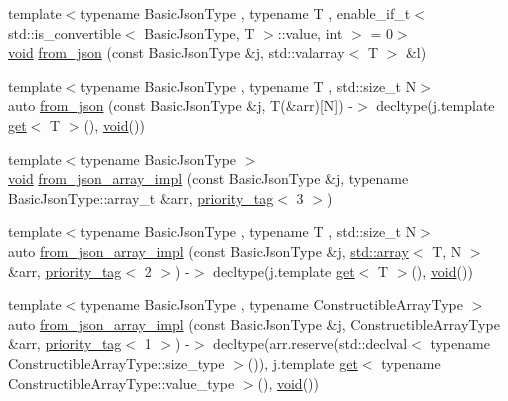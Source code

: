 \begin{DoxyCompactItemize}
\item 
{\footnotesize template$<$typename Basic\+Json\+Type , typename T , enable\+\_\+if\+\_\+t$<$ std\+::is\+\_\+convertible$<$ Basic\+Json\+Type, T $>$\+::value, int $>$  = 0$>$ }\\\mbox{\hyperlink{namespacenlohmann_1_1detail_a59fca69799f6b9e366710cb9043aa77d}{void}} \mbox{\hyperlink{namespacenlohmann_1_1detail_a3df497b1d3977f071b488ecac1401517}{from\+\_\+json}} (const Basic\+Json\+Type \&j, std\+::valarray$<$ T $>$ \&l)
\item 
{\footnotesize template$<$typename Basic\+Json\+Type , typename T , std\+::size\+\_\+t N$>$ }\\auto \mbox{\hyperlink{namespacenlohmann_1_1detail_a7deb2db8eed6f1762373dde7a6595760}{from\+\_\+json}} (const Basic\+Json\+Type \&j, T(\&arr)\mbox{[}N\mbox{]}) -\/$>$ decltype(j.\+template \mbox{\hyperlink{namespacenlohmann_1_1detail_acc422c11342b31368f610b6f96fcedc6}{get}}$<$ T $>$(), \mbox{\hyperlink{namespacenlohmann_1_1detail_a59fca69799f6b9e366710cb9043aa77d}{void}}())
\item 
{\footnotesize template$<$typename Basic\+Json\+Type $>$ }\\\mbox{\hyperlink{namespacenlohmann_1_1detail_a59fca69799f6b9e366710cb9043aa77d}{void}} \mbox{\hyperlink{namespacenlohmann_1_1detail_a40f7bb070a60e8ba14fffb9c117fcbd8}{from\+\_\+json\+\_\+array\+\_\+impl}} (const Basic\+Json\+Type \&j, typename Basic\+Json\+Type\+::array\+\_\+t \&arr, \mbox{\hyperlink{structnlohmann_1_1detail_1_1priority__tag}{priority\+\_\+tag}}$<$ 3 $>$)
\item 
{\footnotesize template$<$typename Basic\+Json\+Type , typename T , std\+::size\+\_\+t N$>$ }\\auto \mbox{\hyperlink{namespacenlohmann_1_1detail_aba0ce45ebb69fd2c7132a00f9a56b503}{from\+\_\+json\+\_\+array\+\_\+impl}} (const Basic\+Json\+Type \&j, \mbox{\hyperlink{namespacenlohmann_1_1detail_a1ed8fc6239da25abcaf681d30ace4985af1f713c9e000f5d3f280adbd124df4f5}{std\+::array}}$<$ T, N $>$ \&arr, \mbox{\hyperlink{structnlohmann_1_1detail_1_1priority__tag}{priority\+\_\+tag}}$<$ 2 $>$) -\/$>$ decltype(j.\+template \mbox{\hyperlink{namespacenlohmann_1_1detail_acc422c11342b31368f610b6f96fcedc6}{get}}$<$ T $>$(), \mbox{\hyperlink{namespacenlohmann_1_1detail_a59fca69799f6b9e366710cb9043aa77d}{void}}())
\item 
{\footnotesize template$<$typename Basic\+Json\+Type , typename Constructible\+Array\+Type $>$ }\\auto \mbox{\hyperlink{namespacenlohmann_1_1detail_a464e1246f3df7edea79c3f81ab701edd}{from\+\_\+json\+\_\+array\+\_\+impl}} (const Basic\+Json\+Type \&j, Constructible\+Array\+Type \&arr, \mbox{\hyperlink{structnlohmann_1_1detail_1_1priority__tag}{priority\+\_\+tag}}$<$ 1 $>$) -\/$>$ decltype(arr.\+reserve(std\+::declval$<$ typename Constructible\+Array\+Type\+::size\+\_\+type $>$()), j.\+template \mbox{\hyperlink{namespacenlohmann_1_1detail_acc422c11342b31368f610b6f96fcedc6}{get}}$<$ typename Constructible\+Array\+Type\+::value\+\_\+type $>$(), \mbox{\hyperlink{namespacenlohmann_1_1detail_a59fca69799f6b9e366710cb9043aa77d}{void}}())

\end{DoxyCompactItemize}
